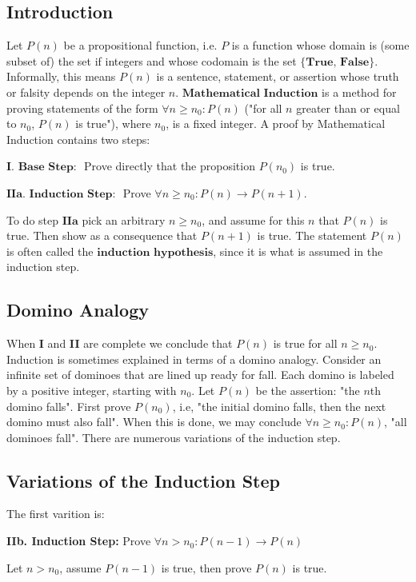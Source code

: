 \documentclass{article}
\begin{document}
\subsection{Introduction}
Let $P(n)$ be a propositional function, i.e. $P$ is a function whose domain is (some subset of) the set if integers and whose codomain is the set $\{\textbf{True, False}\}$. Informally, this means $P(n)$ is a sentence, statement, or assertion whose truth or falsity depends on the integer $n$. $\textbf{Mathematical Induction}$ is a method for proving statements of the form $\forall n \ge n_0: P(n)$ ("for all $n$ greater than or equal to $n_0$, $P(n)$ is true"), where $n_0$, is a fixed integer. A proof by Mathematical Induction contains two steps:

$\textbf{I.    Base Step: }$ Prove directly that the proposition $P(n_0)$ is true.

$\textbf{IIa.  Induction Step: }$ Prove $\forall n \ge n_0 : P(n) \rightarrow P(n+1)$.

To do step $\textbf{IIa}$ pick an arbitrary $n \ge n_0$, and assume for this $n$ that $P(n)$ is true. Then show as a consequence that $P(n+1)$ is true. The statement $P(n)$ is often called the $\textbf{induction hypothesis}$, since it is what is assumed in the induction step.

\subsection{Domino Analogy}
When \textbf{I} and \textbf{II} are complete we conclude that $P(n)$ is true for all $n \ge n_0$. Induction is sometimes explained in terms of a domino analogy. Consider an infinite set of dominoes that are lined up ready for fall. Each domino is labeled by a positive integer, starting with $n_0$. Let $P(n)$ be the assertion: "the $n$th domino falls". First prove $P(n_0)$, i.e, "the initial domino falls, then the next domino must also fall". When this is done, we may conclude $\forall n \ge n_0 : P(n)$, "all dominoes fall". There are numerous variations of the induction step.

\subsection{Variations of the Induction Step}

The first varition is:

\textbf{IIb.    Induction Step: } Prove $\forall n > n_0 : P(n-1) \rightarrow P(n)$ 

Let $n > n_0$, assume $P(n-1)$ is true, then prove $P(n)$ is true.
\end{document}
